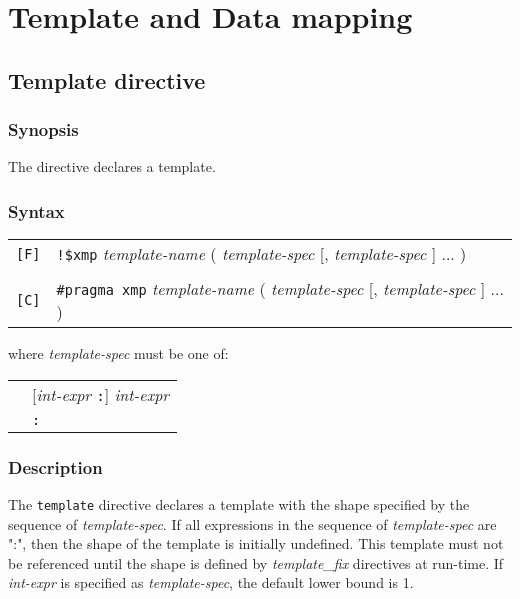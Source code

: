 \section{Template and Data mapping}

\subsection{Template directive}
\subsubsection*{Synopsis}

The {\tt {}} directive declares a template. 

\subsubsection*{Syntax}

\begin{tabular}{ll}
\verb![F]! & \verb|!$xmp| {\it template-name} ( {\it template-spec} 
[, {\it template-spec} ] ... ) \\
& \\
\verb![C]! & \verb|#pragma xmp|  {\it template-name} ( {\it template-spec} 
[, {\it template-spec} ] ... ) \\
\end{tabular}
\vspace{0.3cm}

where {\it template-spec} must be one of:

\hspace{\hsize}

\begin{tabular}{ll}
 \hspace{0.5cm} & [{\it int-expr} {\tt :}] {\it int-expr} \\
 \hspace{0.5cm} & {\tt :} \\
\end{tabular}

\subsubsection*{Description}

The {\tt template} directive declares a template with the shape specified by
the sequence of {\it template-spec}. If all expressions in the sequence of
{\it template-spec} are ":", then the shape of the template is initially
undefined. This template must not be referenced until the shape is
defined by {\it template\_fix} directives at run-time. If {\it
  int-expr} is specified as {\it template-spec}, the default lower bound
is 1. 

